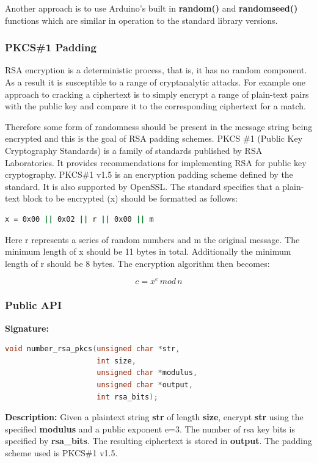 Another approach is to use Arduino's built in \textbf{random()} and \textbf{randomseed()} functions which are similar in operation to the standard library versions.
\subsubsection{PKCS\#1 Padding}
RSA encryption is a deterministic process, that is, it has no random component. As a result it is susceptible to a range of cryptanalytic attacks. For example one approach to cracking a ciphertext is to simply encrypt a range of plain-text pairs with the public key and compare it to the corresponding ciphertext for a match. 

Therefore some form of randomness should be present in the message string being encrypted and this is the goal of RSA padding schemes. PKCS \#1 (Public Key Cryptography Standards) is a family of standards published by RSA Laboratories. It provides recommendations for implementing RSA for public key cryptography. PKCS\#1 v1.5 is an encryption padding scheme defined by the standard. It is also supported by OpenSSL. 
The standard specifies that a plain-text block to be encrypted (x) should be formatted as follows:
\begin{lstlisting}[language=bash, frame=none]
x = 0x00 || 0x02 || r || 0x00 || m
\end{lstlisting}

Here r represents a series of random numbers and m the original message. The minimum length of x should be 11 bytes in total. Additionally the minimum length of r should be 8 bytes. The encryption algorithm then becomes:

\[ c = x^e\,mod\,n\]

\subsubsection{Public API}



\textbf{Signature: } 
\begin{lstlisting}[language=C]
void number_rsa_pkcs(unsigned char *str,
                     int size,
                     unsigned char *modulus,
                     unsigned char *output,
                     int rsa_bits);
\end{lstlisting}
\textbf{Description: }  \linebreak
Given a plaintext string \textbf{str} of length \textbf{size}, encrypt \textbf{str} using the specified \textbf{modulus} and a public exponent e=3. The number of rsa key bits is specified by \textbf{rsa\_bits}. The resulting ciphertext is stored in \textbf{output}. The padding scheme used is PKCS\#1 v1.5.


